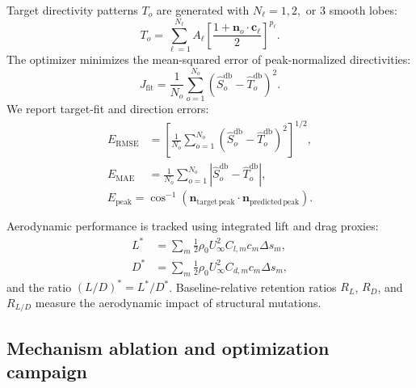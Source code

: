 \documentclass[11pt]{article}
\newcommand{\vect}[1]{\bm{#1}}
\newcommand{\dB}{\si{\decibel}}
\begin{document}
Target directivity patterns $T_o$ are generated with $N_\ell = 1, 2,$ or $3$ smooth lobes:
\begin{equation}
    T_o =
    \sum_{\ell=1}^{N_\ell}
    A_\ell
    \left[
        \frac{1+\vect{n}_o\cdot\vect{c}_\ell}{2}
    \right]^{p_\ell}.
\label{eq:target_generation}
\end{equation}
The optimizer minimizes the mean-squared error of peak-normalized directivities:
\begin{equation}
    J_{\mathrm{fit}}
    =
    \frac{1}{N_o}
    \sum_{o=1}^{N_o}
    \left(
        \hat{S}_o^{\dB}
        -
        \hat{T}_o^{\dB}
    \right)^2.
\label{eq:fit_objective}
\end{equation}
We report target-fit and direction errors:
\begin{align}
    \label{eq:fit_metrics}
    E_{\mathrm{RMSE}}
    &=
    \left[
        \frac{1}{N_o}
        \sum_{o=1}^{N_o}
        \left(
            \hat{S}_o^{\dB}-\hat{T}_o^{\dB}
        \right)^2
    \right]^{1/2},\\
    E_{\mathrm{MAE}}
    &=
    \frac{1}{N_o}
    \sum_{o=1}^{N_o}
    \left|
        \hat{S}_o^{\dB}-\hat{T}_o^{\dB}
    \right|,
\end{align}
\begin{equation}
    E_{\mathrm{peak}}
    =
    \cos^{-1}
    \left(
        \vect{n}_{\mathrm{target\,peak}}
        \cdot
        \vect{n}_{\mathrm{predicted\,peak}}
    \right).
\end{equation}

Aerodynamic performance is tracked using integrated lift and drag proxies:
\begin{align}
    \label{eq:aero_proxies}
    L^*
    &=
    \sum_m
    \frac{1}{2}\rho_0U_\infty^2
    C_{l,m}c_m\Delta s_m,\\
    D^*
    &=
    \sum_m
    \frac{1}{2}\rho_0U_\infty^2
    C_{d,m}c_m\Delta s_m,
\end{align}
and the ratio $(L/D)^* = L^*/D^*$. Baseline-relative retention ratios $R_L$, $R_D$, and $R_{L/D}$ measure the aerodynamic impact of structural mutations.

\subsection{Mechanism ablation and optimization campaign}
\end{document}
